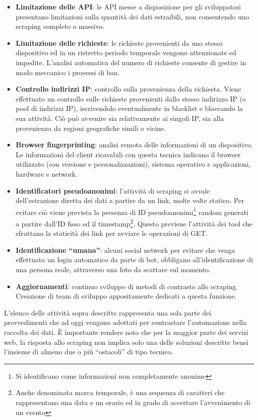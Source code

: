 \begin{itemize}
    Si riporta un esempio estratto dal file robots di Facebook\footnote{\url{https://www.facebook.com/robots.txt}}:
    \inputminted[bgcolor=bg]{text}{codice/robots.txt}
    \item \textbf{Limitazione delle API}: le API messe a disposizione per gli  sviluppatori presentano limitazioni sulla quantit\`a dei dati estraibili, non consentendo uno scraping completo o massivo.
    \item \textbf{Limitazione delle richieste}: le richieste provenienti da uno stesso dispositivo ed in un ristretto periodo temporale vengono attenzionate ed impedite. L'analisi automatica del numero di richieste consente di gestire in modo meccanico i processi di ban.
    \item \textbf{Controllo indirizzi IP}: controllo sulla provenienza della richiesta. Viene effettuato un controllo sulle richieste provenienti dallo stesso indirizzo IP (o pool di indirizzi IP), iscrivendolo eventualmente in blacklist e bloccando la sua attivit\`a. Ci\`o pu\`o avvenire sia relativamente ai singoli IP, sia alla provenienza da regioni geografiche simili o vicine.
    \item \textbf{Browser fingerprinting}: analisi remota delle informazioni di un dispositivo. Le informazioni del client ricavabili con questa tecnica indicano il browser utilizzato (con versione e personalizzazioni), sistema operativo e applicazioni, hardware e network.\cite{nikiforakis2013cookieless}
    \item \textbf{Identificatori pseudoanonimi}: l'attivit\`a di scraping si avvale dell'estrazione diretta dei dati a partire da un link, molte volte statico. Per evitare ci\`o viene prevista la presenza di ID pseudoanonimi\footnote{Si identificano come informazioni non completamente anonime} random generati a partire dall'ID fisso ed il timestamp\footnote{Anche denominata marca temporale, \`e una sequenza di caratteri che rappresentano una data e un orario ed in grado di accertare l'avvenimento di un evento}. Questo previene l'attivit\`a dei tool che sfruttano la staticit\`a dei link per avviare le operazioni di GET. 
    \item \textbf{Identificazione ``umana''}: alcuni social network per evitare che venga effettuato un login automatico da parte di bot, obbligano  all'identificazione di una persona reale, attraverso una foto da scattare sul momento.
    \item \textbf{Aggiornamenti}: continuo sviluppo di metodi di contrasto allo scraping. Creazione di team di sviluppo appositamente dedicati a questa funzione.
\end{itemize}
L'elenco delle attivit\`a sopra descritte rappresenta una sola parte dei provvedimenti che ad oggi vengono adottati per contrastare l'automazione nella raccolta dei dati. \`E importante rendere noto che per la maggior parte dei servizi web, la risposta allo scraping non implica solo una delle soluzioni descritte bens\`i l'insieme di almeno due o pi\`u ``ostacoli'' di tipo tecnico.
